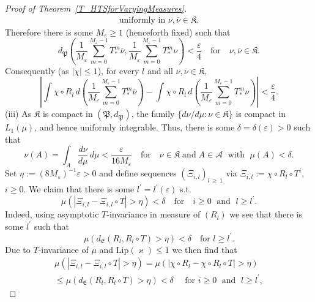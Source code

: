 \documentclass[AHL,Unicode,longabstracts]{cedram}
\newcommand{\clA}{\mathcal{A}}
\newcommand{\Lip}{\mathrm{Lip}}
\newcommand{\frkK}{\mathfrak{K}}
\newcommand{\frkP}{\mathfrak{P}}
\newcommand{\frkE}{\mathfrak{E}}
\begin{document}
\begin{proof}[{Proof of Theorem~\ref{T_HTSforVaryingMeasures}}]
\[\begin{aligned}
\text{uniformly in }\nu,\overline{\nu}\in\frkK.
\end{aligned}
\]
Therefore there is some $M_{\varepsilon}\geq1$ (henceforth fixed) such that
\[
d_{\frkP}\left(\frac{1}{M_{\varepsilon}}\sum_{m=0}^{M_{\varepsilon }-1}T_{\ast}^{m}\overline{\nu},\frac{1}{M_{\varepsilon}}\sum_{m=0} ^{M_{\varepsilon}-1}T_{\ast}^{m}\nu\right) <\frac{\varepsilon}{4} \quad\text{for}\quad\nu,\overline{\nu}\in\frkK.
\]
Consequently (as $\left\vert \chi\right\vert \leq1$), for every $l$ and all $\nu,\overline{\nu}\in\frkK$,
\begin{equation}
\left\vert \int\chi\circ R_{l}\,d\left(\frac{1}{M_{\varepsilon}}\sum _{m=0}^{M_{\varepsilon}-1}T_{\ast}^{m}\overline{\nu}\right) -\int\chi\circ R_{l}\,d\left(\frac{1}{M_{\varepsilon}}\sum_{m=0}^{M_{\varepsilon}-1} T_{\ast}^{m}\nu\right) \right\vert <\frac{\varepsilon}{4}.\label{Eq_TheSmearedComparison}
\end{equation}
(iii) \label{prf.theo6.3.3} As $\frkK$ is compact in $(\frkP,d_{\frkP })$, the family $\{d\nu/d\mu:\nu\in\frkK\}$ is compact in $L_{1}(\mu)$, and hence uniformly integrable. Thus, there is some $\delta=\delta (\varepsilon)>0$ such that
\begin{equation}\label{Eq_HuHu}
\nu(A)=\int_{A}\frac{d\nu}{d\mu}\,d\mu<\frac{\varepsilon}{16M_{\varepsilon} }\quad\text{for}\quad \nu\in\frkK\;\text{and}\;A\in\clA\; \text{ with }\;\mu(A)<\delta.
\end{equation}
Set $\eta:=(8M_{\varepsilon})^{-1}\varepsilon>0$ and define sequences $(\Xi_{i,l})_{l\,\geq\,1}$ via $\Xi_{i,l}:=\chi\circ R_{l}\circ T^{i}$, $i\geq0$. We claim that there is some $l^{\prime}=l^{\prime}(\varepsilon)$ s.t.
\begin{equation}\label{Eq_DefiningLPrime}
\mu\left(\left\vert \Xi_{i,l}-\Xi_{i,l}\circ T\right\vert >\eta\right) <\delta\quad \text{for}\quad i\geq0\;\text{ and }\;l\geq l^{\prime}.
\end{equation}
Indeed, using asymptotic $T$-invariance in measure of $(R_{l})$ we see that there is some $l^{\prime}$ such that
\[
\mu\left(d_{\frkE}(R_{l},R_{l}\circ T)>\eta\right) <\delta
\quad \text{for }l\geq l^{\prime}.
\]
Due to $T$-invariance of $\mu$ and $\Lip(\varkappa)\leq1$ we then find that
\begin{multline*}
\mu\left(\left\vert \Xi_{i,l}-\Xi_{i,l}\circ T\right\vert >\eta\right)
 =\mu\left(\left\vert \chi\circ R_{l}-\chi\circ R_{l}\circ T\right\vert >\eta\right)\\
 \leq\mu\left(d_{\frkE}(R_{l},R_{l}\circ T)>\eta\right) 
 <\delta\quad \text{ for }i\geq0\;\text{ and }\;l\geq l^{\prime},

\end{multline*}
\end{proof}
\end{document}
